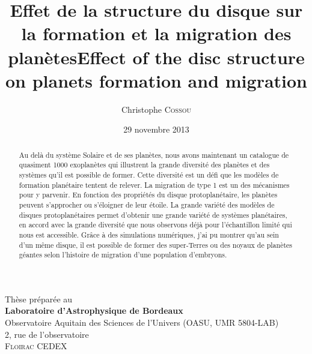 \documentclass[logos,chaptertoc]{bordeaux-thesis}
\author{Christophe \textsc{Cossou}}
\title{Effet de la structure du disque sur la formation et la migration des planètes}
\title[english]{Effect of the disc structure on planets formation and migration}
\date{29 novembre 2013}
\begin{document}
\maketitle%

\pagestyle{empty}

\cleardoublepage
\null
\vfill
\noindent
{}\hfill
  \begin{minipage}[b]{.75\textwidth}
  \noindent Th\`{e}se pr\'{e}par\'{e}e au\\{\footnotesize
    \textbf{Laboratoire d'Astrophysique de Bordeaux}\\
    Observatoire Aquitain des Sciences de l'Univers (OASU, UMR 5804-LAB)\\
    2, rue de l'observatoire\\
     \textsc{Floirac CEDEX}}
  \end{minipage}
\hfill
\cleardoublepage



\begin{abstract}
Au delà du système Solaire et de ses planètes, nous avons maintenant un catalogue de quasiment 1000 exoplanètes qui illustrent la grande diversité des planètes et des systèmes qu'il est possible de former. Cette diversité est un défi que les modèles de formation planétaire tentent de relever. La migration de type 1 est un des mécanismes pour y parvenir. En fonction des propriétés du disque protoplanétaire, les planètes peuvent s'approcher ou s'éloigner de leur étoile. La grande variété des modèles de disques protoplanétaires permet d'obtenir une grande variété de systèmes planétaires, en accord avec la grande diversité que nous observons déjà pour l'échantillon limité qui nous est accessible. Grâce à des simulations numériques, j'ai pu montrer qu'au sein d'un même disque, il est possible de former des super-Terres ou des noyaux de planètes géantes selon l'histoire de migration d'une population d'embryons.
\end{abstract}

\noindent\hspace*{0.35\textwidth}\hrulefill\hspace*{0.35\textwidth}\\[-\bigskipamount]
\end{document}
